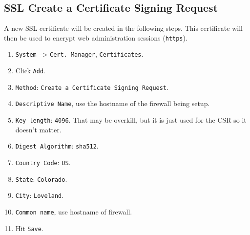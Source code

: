 \subsection{SSL Create a Certificate Signing Request}
A new SSL certificate will be created in the following steps. This certificate will then be used to
encrypt web administration sessions (\texttt{https}).

\begin{enumerate}
 \item \texttt{System} --> \texttt{Cert. Manager}, \texttt{Certificates}.
 \item Click \texttt{Add}.
 \item \texttt{Method}: \texttt{Create a Certificate Signing Request}.
 \item \texttt{Descriptive Name}, use the hostname of the firewall being setup.
 \item \texttt{Key length}: \texttt{4096}. That may be overkill, but it is just used for the CSR so it doesn't matter.
 \item \texttt{Digest Algorithm}: \texttt{sha512}.
 \item \texttt{Country Code}: \texttt{US}.
 \item \texttt{State}: \texttt{Colorado}. %
 \item \texttt{City}: \texttt{Loveland}.
 \item \texttt{Common name}, use hostname of firewall.
 \item Hit \texttt{Save}.
\end{enumerate}

